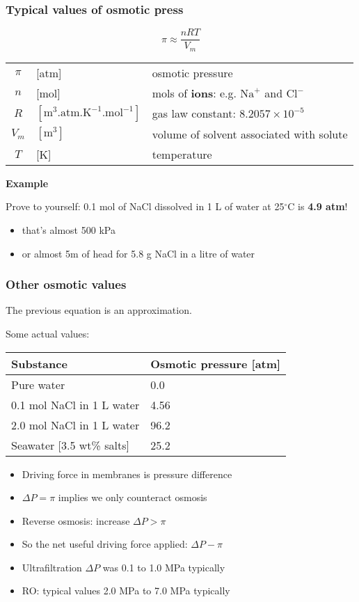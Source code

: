 \begin{frame}\frametitle{Typical values of osmotic press}
	\begin{exampleblock}{}
		\[
			\pi \approx \displaystyle \frac{nRT}{V_m}
		\]
	\end{exampleblock}
	\begin{tabular}{cll}
		$\pi$		&	[atm] 													& osmotic pressure \\
		$n$ 		&  	[mol]													& mols of \textbf{ions}: e.g. $\text{Na}^{+}$ and $\text{Cl}^{-}$\\
		$R$			&	$[\text{m}^3\text{.atm.K}^{-1}\text{.mol}^{-1}]$ 		& gas law constant: $8.2057 \times 10^{-5}$\\
		$V_m$ 		&  	$[\text{m}^{3}]$										& volume of solvent associated with solute\\
		$T$ 		&  	[K]														& temperature
	\end{tabular}
	
	\textbf{Example}
	
	\vspace{12pt}
	Prove to yourself: 0.1 mol of NaCl dissolved in 1 L of water at 25$^\circ$C is \textbf{4.9 atm}!
	\begin{itemize}
		\item	that's almost 500 kPa
		\item	or almost 5m of head for 5.8 g NaCl in a litre of water
	\end{itemize}
\end{frame}

\begin{frame}\frametitle{Other osmotic values}
	The previous equation is an approximation. 
	
	\vspace{12pt}
	Some actual values:
	\begin{tabular}{ll}\\ \hline
	 	\textbf{Substance}  		& \textbf{Osmotic pressure [atm]} \\ \hline
		Pure water					& 0.0\\
		0.1 mol NaCl in 1 L water 	& 4.56\\
		2.0 mol NaCl in 1 L water	& 96.2\\
		Seawater [3.5 wt\% salts]	& 25.2\\
	\end{tabular}
	
	\begin{itemize}
		\item	Driving force in membranes is pressure difference
		\item	$\Delta P = \pi$ implies we only counteract osmosis
		\item	Reverse osmosis: increase $\Delta P > \pi$
		\item	So the net useful driving force applied: $\Delta P - \pi$
		\item	Ultrafiltration $\Delta P$ was 0.1 to 1.0 MPa typically
		\item	RO: typical values 2.0 MPa to 7.0 MPa typically
	\end{itemize}	
\end{frame}

